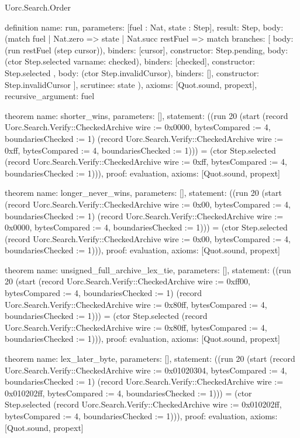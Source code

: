 \begin{lexlean}{Uorc.Search.Order}
\begin{semanticmodule}
definition{
  name: run,
  parameters: [fuel : Nat, state : Step],
  result: Step,
  body: (match fuel
    | Nat.zero => state
    | Nat.succ restFuel => match{
      branches: [
        {body: (run restFuel (step cursor)), binders: [cursor], constructor: Step.pending},
        {
          body: (ctor Step.selected var{name: checked}),
          binders: [checked],
          constructor: Step.selected
        },
        {body: (ctor Step.invalidCursor), binders: [], constructor: Step.invalidCursor}
      ],
      scrutinee: state
    }),
  axioms: [Quot.sound, propext],
  recursive_argument: fuel
}

theorem{
  name: shorter_wins,
  parameters: [],
  statement: ((run 20 (start (record Uorc.Search.Verify::CheckedArchive {wire := 0x0000, bytesCompared := 4, boundariesChecked := 1}) (record Uorc.Search.Verify::CheckedArchive {wire := 0xff, bytesCompared := 4, boundariesChecked := 1}))) = (ctor Step.selected (record Uorc.Search.Verify::CheckedArchive {wire := 0xff, bytesCompared := 4, boundariesChecked := 1}))),
  proof: evaluation{},
  axioms: [Quot.sound, propext]
}

theorem{
  name: longer_never_wins,
  parameters: [],
  statement: ((run 20 (start (record Uorc.Search.Verify::CheckedArchive {wire := 0x00, bytesCompared := 4, boundariesChecked := 1}) (record Uorc.Search.Verify::CheckedArchive {wire := 0x0000, bytesCompared := 4, boundariesChecked := 1}))) = (ctor Step.selected (record Uorc.Search.Verify::CheckedArchive {wire := 0x00, bytesCompared := 4, boundariesChecked := 1}))),
  proof: evaluation{},
  axioms: [Quot.sound, propext]
}

theorem{
  name: unsigned_full_archive_lex_tie,
  parameters: [],
  statement: ((run 20 (start (record Uorc.Search.Verify::CheckedArchive {wire := 0xff00, bytesCompared := 4, boundariesChecked := 1}) (record Uorc.Search.Verify::CheckedArchive {wire := 0x80ff, bytesCompared := 4, boundariesChecked := 1}))) = (ctor Step.selected (record Uorc.Search.Verify::CheckedArchive {wire := 0x80ff, bytesCompared := 4, boundariesChecked := 1}))),
  proof: evaluation{},
  axioms: [Quot.sound, propext]
}

theorem{
  name: lex_later_byte,
  parameters: [],
  statement: ((run 20 (start (record Uorc.Search.Verify::CheckedArchive {wire := 0x01020304, bytesCompared := 4, boundariesChecked := 1}) (record Uorc.Search.Verify::CheckedArchive {wire := 0x010202ff, bytesCompared := 4, boundariesChecked := 1}))) = (ctor Step.selected (record Uorc.Search.Verify::CheckedArchive {wire := 0x010202ff, bytesCompared := 4, boundariesChecked := 1}))),
  proof: evaluation{},
  axioms: [Quot.sound, propext]
}


\end{semanticmodule}
\end{lexlean}
